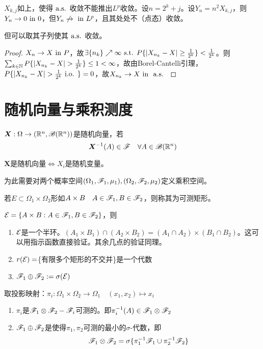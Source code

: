 \documentclass{ctexbook}
\begin{document}
\begin{Eg}
  $X_{k,j}$如上，使得$\text{ a.s. }$收敛不能推出$L^{p}$收敛。设$n=2^{k}+j$。设$Y_{n}=n^{2}X_{k,j}$，则$Y_{n}\to 0\text{ in } 0$，但$Y_{n}\not\to\text{ in } L^{p}$，且其处处不（点态）收敛。

  但可以取其子列使其$\text{ a.s. }$收敛。
\end{Eg}

\begin{proof}
  $X_{n}\to X\text{ in } P$，故$\exists \{n_{k}\}\nearrow\infty\text{ s.t. } P\{|X_{n_{k}}-X|\geq\frac{1}{2^{k}}\}<\frac{1}{2^{k}}$。则$\sum_{k\in\N}P\{|X_{n_{k}}-X|>\frac{1}{2^{k}}\}\leq 1<\infty$，故由Borel-Cantelli引理，$P\{|X_{n_{k}}-X|>\frac{1}{2^{k}}\inof\}=0$，故$X_{n_{k}}\to X\text{ in }\text{ a.s. }$
\end{proof}

\section{随机向量与乘积测度}
\begin{Def}
  $\bm X:\Omega\to (\mathbb{R}^{n},\mathscr{B}(\mathbb{R}^{n}))$是随机向量，若
  \[\bm{X}^{-1}(A)\in\mathscr{F}\quad\forall A\in\mathscr{B}(\mathbb{R}^{n})\]
\end{Def}

\begin{Prop}
  $\bm{X}$是随机向量$\Leftrightarrow X_{i}$是随机变量。
\end{Prop}

为此需要对两个概率空间$(\Omega_{1},\mathscr{F}_{1},\mu_{1}),(\Omega_{2},\mathscr{F}_{2},\mu_{2})$定义乘积空间。

\begin{Def}[可测矩形]
  若$E\subset \Omega_{1}\times\Omega_{2}$形如$A\times B\quad A\in\mathscr{F}_{1},B\in \mathscr{F}_{2}$，则称其为可测矩形。
\end{Def}
$\mathcal{E}=\{A\times B:A\in\mathscr{F}_{1},B\in \mathscr{F}_{2}\}$，则
\begin{enumerate}
\item $\mathcal{E}$是一个半环。$(A_{1}\times B_{1})\cap (A_{2}\times B_{2})=(A_{1}\cap A_{2})\times (B_{1}\cap B_{2})$。这可以用指示函数直接验证。其余几点的验证同理。
\item $r(\mathcal{E})=$\{有限多个矩形的不交并\}是一个代数
\item $\mathscr{F}_{1}\oplus \mathscr{F}_{2}:=\sigma(\mathcal{E})$ 
\end{enumerate}

取投影映射：$\pi_{i}:\Omega_{1}\times \Omega_{2}\to\Omega_{1}\quad (x_{1},x_{2})\mapsto x_{i}$
\begin{Prop}
  \begin{enumerate}
  \item $\pi_{i}$是$\mathscr{F}_{1}\otimes\mathscr{F}_{2}-\mathscr{F}_{i}$可测的。即$\pi_{i}^{-1}(A)\in \mathscr{F}_{1}\otimes \mathscr{F}_{2}$
  \item $\mathscr{F}_{1}\oplus\mathscr{F}_{2}$是使得$\pi_{1},\pi_{2}$可测的最小的$\sigma$-代数，即
    \[\mathscr{F}_{1}\otimes\mathscr{F}_{2}=\sigma\{\pi_{1}^{-1}\mathscr{F}_{1}\cup \pi_{2}^{-1}\mathscr{F}_{2}\}\]
  \end{enumerate}
\end{Prop}
\end{document}
